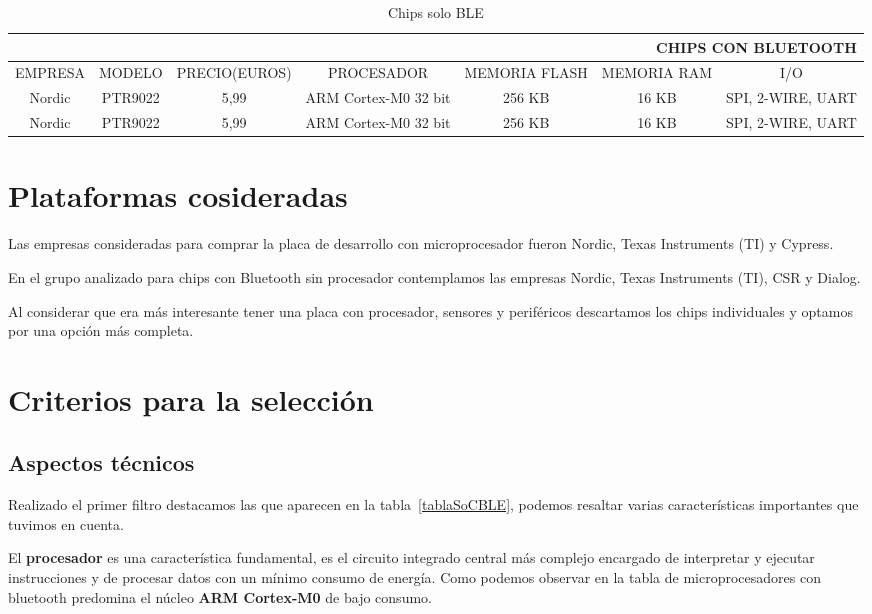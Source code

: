 \begin{table}
	\begin{center}
	\begin{tabular}[c]{|c|c|c|c|c|c|c|}
        \hline
        \multicolumn{7}{r}{CHIPS CON BLUETOOTH} \\
        \hline
        EMPRESA & MODELO & PRECIO(EUROS) & PROCESADOR & MEMORIA FLASH & MEMORIA RAM & I/O \\
        \hline
        Nordic & PTR9022 & 5,99 & ARM Cortex-M0 32 bit & 256 KB & 16 KB & SPI, 2-WIRE, UART \\
        Nordic & PTR9022 & 5,99 & ARM Cortex-M0 32 bit & 256 KB & 16 KB & SPI, 2-WIRE, UART \\
    	\hline
	\end{tabular}
    \caption{Chips solo BLE}
    \label{tablaBLE}
   \end{center}
\end{table}

\section{Plataformas cosideradas}
\label{makereference3.2}

Las empresas consideradas para comprar la placa de desarrollo con microprocesador fueron Nordic, Texas Instruments (TI) y Cypress.

En el grupo analizado para chips con Bluetooth sin procesador contemplamos las empresas Nordic,  Texas Instruments (TI), CSR y Dialog. 

Al considerar que era más interesante tener una placa con procesador, sensores y periféricos descartamos los chips individuales y optamos por una opción más completa.

\section{Criterios para la selección}
\label{makereference3.3}

\subsection{Aspectos técnicos}
\label{makereference3.3.1}

Realizado el primer filtro destacamos las que aparecen en la tabla~\ref{tablaSoCBLE}, podemos resaltar varias características importantes que tuvimos en cuenta.

El \textbf{procesador} es una característica fundamental, es el circuito integrado central más complejo encargado de interpretar y ejecutar instrucciones y de procesar datos con un mínimo consumo de energía. 
Como podemos observar en la tabla de microprocesadores con bluetooth predomina el núcleo \textbf{ARM Cortex-M0} de bajo consumo.


